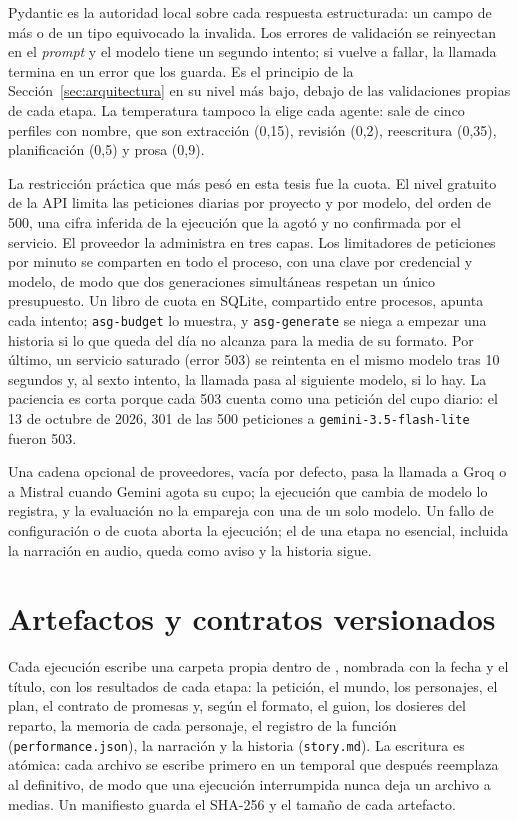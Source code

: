Pydantic es la autoridad local sobre cada respuesta estructurada: un campo de más o de un tipo
equivocado la invalida. Los errores de validación se reinyectan en el \textit{prompt} y el modelo
tiene un segundo intento; si vuelve a fallar, la llamada termina en un error que los guarda. Es el
principio de la Sección~\ref{sec:arquitectura} en su nivel más bajo, debajo de las validaciones
propias de cada etapa. La temperatura tampoco la elige cada agente: sale de cinco perfiles con
nombre, que son extracción (0,15), revisión (0,2), reescritura (0,35), planificación (0,5) y prosa
(0,9).

La restricción práctica que más pesó en esta tesis fue la cuota. El nivel gratuito de la API limita
las peticiones diarias por proyecto y por modelo, del orden de 500, una cifra inferida de la
ejecución que la agotó y no confirmada por el servicio. El proveedor la administra en tres capas.
Los limitadores de peticiones por minuto se comparten en todo el proceso, con una clave por
credencial y modelo, de modo que dos generaciones simultáneas respetan un único presupuesto. Un
libro de cuota en SQLite, compartido entre procesos, apunta cada intento; \texttt{asg-budget} lo
muestra, y \texttt{asg-generate} se niega a empezar una historia si lo que queda del día no alcanza
para la media de su formato. Por último, un servicio saturado (error 503) se reintenta en el mismo
modelo tras 10 segundos y, al sexto intento, la llamada pasa al siguiente modelo, si lo hay. La
paciencia es corta porque cada 503 cuenta como una petición del cupo diario: el 13 de octubre de
2026, 301 de las 500 peticiones a \texttt{gemini-3.5-flash-lite} fueron 503.

Una cadena opcional de proveedores, vacía por defecto, pasa la llamada a Groq o a Mistral cuando
Gemini agota su cupo; la ejecución que cambia de modelo lo registra, y la evaluación no la empareja
con una de un solo modelo. Un fallo de configuración o de cuota aborta la ejecución; el de una etapa
no esencial, incluida la narración en audio, queda como aviso y la historia sigue.

\section{Artefactos y contratos versionados}\label{sec:artefactos}

Cada ejecución escribe una carpeta propia dentro de , nombrada con la
fecha y el título, con los resultados de cada etapa: la petición, el mundo, los personajes, el plan,
el contrato de promesas y, según el formato, el guion, los dosieres del reparto, la memoria de cada
personaje, el registro de la función (\texttt{performance.json}), la narración y la historia
(\texttt{story.md}). La escritura es atómica: cada archivo se escribe primero en un temporal que
después reemplaza al definitivo, de modo que una ejecución interrumpida nunca deja un archivo a
medias. Un manifiesto guarda el SHA-256 y el tamaño de cada artefacto.

